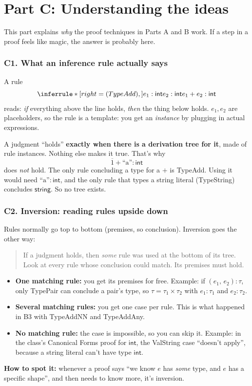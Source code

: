 \documentclass[11pt]{article}
\newcommand{\PAIR}[2]{(#1,\, #2)}
\newcommand{\INT}{\mathsf{int}}
\newcommand{\STRING}{\mathsf{string}}
\newcommand{\num}[1]{\overline{#1}}
\newcommand{\str}[1]{\text{``#1''}}
\begin{document}
\newpage
\part*{Part C: Understanding the ideas}

This part explains \emph{why} the proof techniques in Parts A and B work.
If a step in a proof feels like magic, the answer is probably here.

\section*{C1. What an inference rule actually says}

A rule
\[
  \Rule{TypeAdd}{e_1:\INT \\ e_2:\INT}{e_1+e_2:\INT}
\]
reads: \emph{if} everything above the line holds, \emph{then} the thing below
holds. $e_1,e_2$ are placeholders, so the rule is a template: you get an
\emph{instance} by plugging in actual expressions.

A judgment ``holds'' \textbf{exactly when there is a derivation tree for
it}, made of rule instances. Nothing else makes it true. That's why
\[
  \num1 + \str{a} : \INT
\]
does \emph{not} hold. The only rule concluding a type for a $+$ is TypeAdd.
Using it would need $\str{a}:\INT$, and the only rule that types a string
literal (TypeString) concludes $\STRING$. So no tree exists.

\section*{C2. Inversion: reading rules upside down}

Rules normally go top to bottom (premises, so conclusion). Inversion goes the
other way:
\begin{quote}
If a judgment holds, then \emph{some} rule was used at the bottom of its
tree. Look at every rule whose conclusion could match. Its premises must hold.
\end{quote}
\begin{itemize}
  \item \textbf{One matching rule:} you get its premises for free. Example:
        if $\PAIR{e_1}{e_2}:\tau$, only TypePair can conclude a pair's type,
        so $\tau=\tau_1\times\tau_2$ with $e_1:\tau_1$ and $e_2:\tau_2$.
  \item \textbf{Several matching rules:} you get one case per rule. This is
        what happened in B3 with TypeAddNN and TypeAddAny.
  \item \textbf{No matching rule:} the case is impossible, so you can skip
        it. Example: in the class's Canonical Forms proof for $\INT$, the
        ValString case ``doesn't apply'', because a string literal can't
        have type $\INT$.
\end{itemize}
\textbf{How to spot it:} whenever a proof says ``we know $e$ has
\emph{some} type, and $e$ has a specific shape'', and then needs to know
more, it's inversion.
\end{document}
